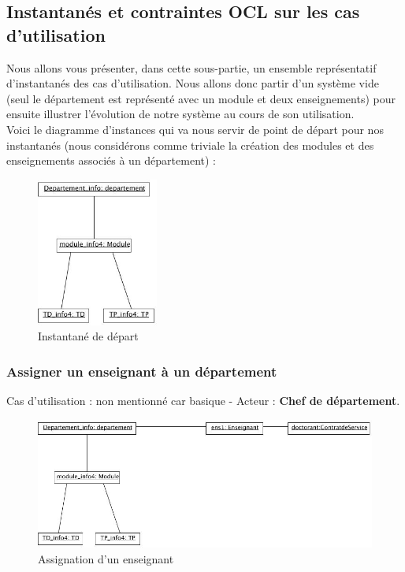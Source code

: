  \subsection{Instantanés et contraintes OCL sur les cas d'utilisation}
 \indent Nous allons vous présenter, dans cette sous-partie, un ensemble représentatif d'instantanés des cas d'utilisation. Nous allons donc partir d'un système vide (seul le département est représenté avec un module et deux enseignements) pour ensuite illustrer l'évolution de notre système au cours de son utilisation.\\
 \indent Voici le diagramme d'instances qui va nous servir de point de départ pour nos instantanés (nous considérons comme triviale la création des modules et des enseignements associés à un département) :

 \begin{figure}[!htbp]
 \begin{center}
 \includegraphics[width=4cm]{fig/base.jpg}
 \caption{Instantané de départ}
 \end{center}
 \end{figure}

 \subsubsection{Assigner un enseignant à un département}
 \indent Cas d'utilisation : non mentionné car basique - Acteur : \textbf{Chef de département}.

 \begin{figure}[!htbp]
 \begin{center}
 \includegraphics[width=12cm]{fig/1-assignEnseignant.jpg}
 \caption{Assignation d'un enseignant}
 \end{center}
 \end{figure}

